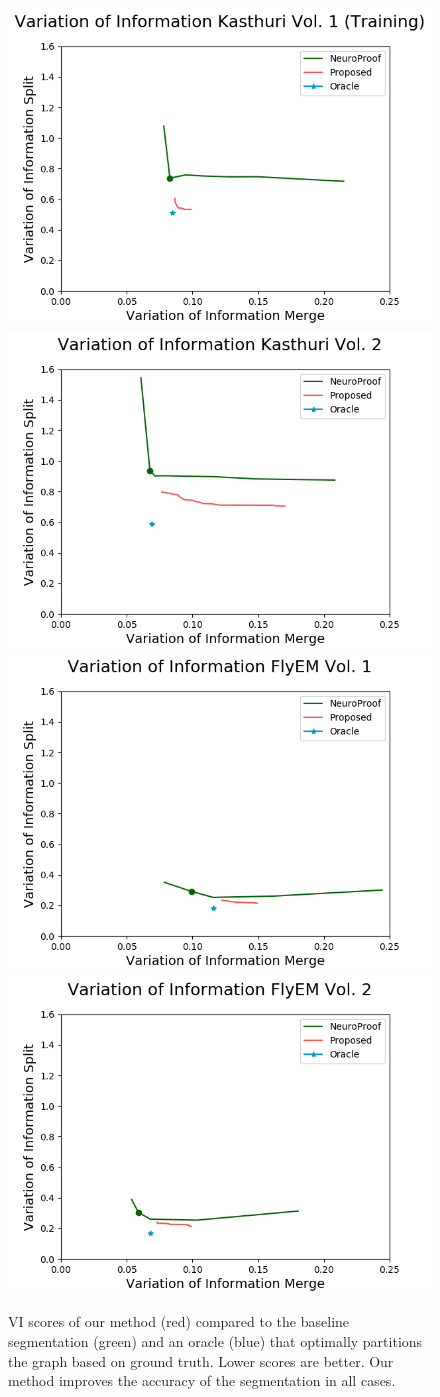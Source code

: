 
\begin{figure}[t!]
	\centering
	\includegraphics[width=0.45\linewidth]{./figures/variation_of_information-microns-train-600.png}
	\includegraphics[width=0.45\linewidth]{./figures/variation_of_information-microns-test-600.png}
	\includegraphics[width=0.45\linewidth]{./figures/variation_of_information-FlyEM-train-600.png}
	\includegraphics[width=0.45\linewidth]{./figures/variation_of_information-FlyEM-test-600.png}
	\caption{VI scores of our method (red) compared to the baseline segmentation (green) and an oracle (blue) that optimally partitions the graph based on ground truth. Lower scores are better. Our method improves the accuracy of the segmentation in all cases.}
	\label{fig:variation-of-information}
\end{figure}

